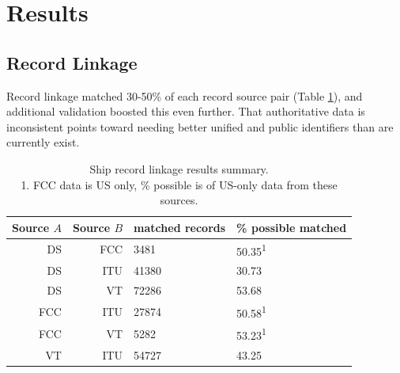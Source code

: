 \documentclass[12pt,letterpaper]{article}
\begin{document}
\section{\textbf{Results}}



\subsection{Record Linkage}

Record linkage matched 30-50\% of each record source pair (Table \ref{table:ships-record-linkage-results-summary}), and additional validation boosted this even further. That authoritative data is inconsistent points toward needing better unified and public identifiers than are currently exist.

\begin{table}[htbp]
  \begin{tabular}{rrll} %
    \hline
    Source $A$ & Source $B$ & matched records & \% possible matched \\
    \hline
     DS & FCC &  3481 & 50.35\textsuperscript{1} \\
     DS & ITU & 41380 & 30.73 \\
     DS &  VT & 72286 & 53.68 \\
    FCC & ITU & 27874 & 50.58\textsuperscript{1} \\
    FCC &  VT &  5282 & 53.23\textsuperscript{1} \\
     VT & ITU & 54727 & 43.25 \\
  \end{tabular}
  \caption{Ship record linkage results summary. \\
    1. FCC data is US only, \% possible is of US-only data from these sources.}
  \label{table:ships-record-linkage-results-summary}
\end{table}
\end{document}
